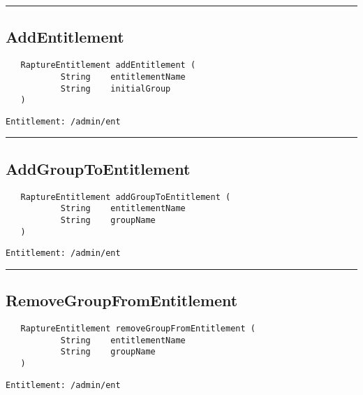 \rule{12cm}{2pt}
\subsection{AddEntitlement}
\label{Api:AddEntitlement}
\begin{verbatim}
   RaptureEntitlement addEntitlement (
           String    entitlementName
           String    initialGroup
   )
\end{verbatim}
\begin{Verbatim}[fontsize=\small, formatcom=\color{Maroon}]
  Entitlement: /admin/ent
\end{Verbatim}



\rule{12cm}{2pt}
\subsection{AddGroupToEntitlement}
\label{Api:AddGroupToEntitlement}
\begin{verbatim}
   RaptureEntitlement addGroupToEntitlement (
           String    entitlementName
           String    groupName
   )
\end{verbatim}
\begin{Verbatim}[fontsize=\small, formatcom=\color{Maroon}]
  Entitlement: /admin/ent
\end{Verbatim}



\rule{12cm}{2pt}
\subsection{RemoveGroupFromEntitlement}
\label{Api:RemoveGroupFromEntitlement}
\begin{verbatim}
   RaptureEntitlement removeGroupFromEntitlement (
           String    entitlementName
           String    groupName
   )
\end{verbatim}
\begin{Verbatim}[fontsize=\small, formatcom=\color{Maroon}]
  Entitlement: /admin/ent
\end{Verbatim}



